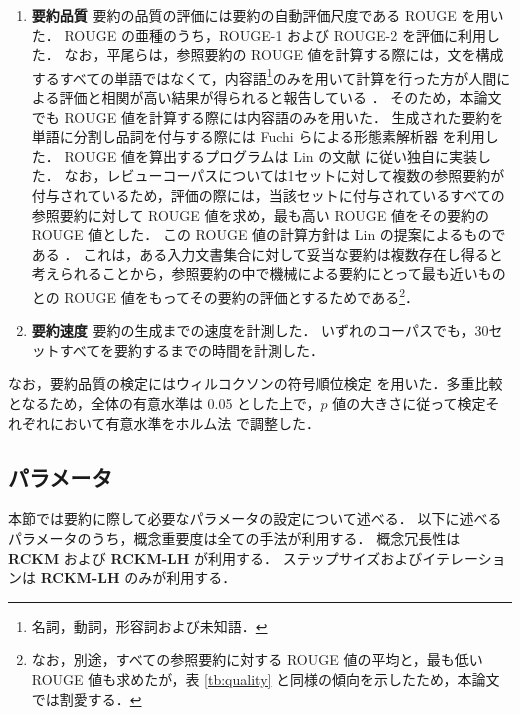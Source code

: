 \documentclass[japanese]{jnlp_1.4}
\begin{document}
\begin{enumerate}
\item {\bf 要約品質}\hspace{1zw}
\pagebreak
要約の品質の評価には要約の自動評価尺度である ROUGE \cite{lin04} を用いた．
ROUGE の亜種のうち，ROUGE-1 および ROUGE-2 を評価に利用した．
なお，平尾らは，参照要約の ROUGE 値を計算する際には，文を構成するすべての単語ではなくて，内容語\footnote{名詞，動詞，形容詞および未知語．}のみを用いて計算を行った方が人間による評価と相関が高い結果が得られると報告している \cite{hirao06}．
そのため，本論文でも ROUGE 値を計算する際には内容語のみを用いた．
生成された要約を単語に分割し品詞を付与する際には Fuchi らによる形態素解析器 \cite{fuchi98} を利用した．
ROUGE 値を算出するプログラムは Lin の文献 \cite{lin04} に従い独自に実装した．
なお，レビューコーパスについては1セットに対して複数の参照要約が付与されているため，評価の際には，当該セットに付与されているすべての参照要約に対して ROUGE 値を求め，最も高い ROUGE 値をその要約の ROUGE 値とした．
この ROUGE 値の計算方針は Lin の提案によるものである \cite{lin04}．
これは，ある入力文書集合に対して妥当な要約は複数存在し得ると考えられることから，参照要約の中で機械による要約にとって最も近いものとの ROUGE 値をもってその要約の評価とするためである\footnote{なお，別途，すべての参照要約に対する ROUGE 値の平均と，最も低い ROUGE 値も求めたが，表 \ref{tb:quality} と同様の傾向を示したため，本論文では割愛する．}．

\item {\bf 要約速度}\hspace{1zw}
要約の生成までの速度を計測した．
いずれのコーパスでも，30セットすべてを要約するまでの時間を計測した．
\end{enumerate}

なお，要約品質の検定にはウィルコクソンの符号順位検定 \cite{wilcoxon45} を用いた．多重比較となるため，全体の有意水準は 0.05 とした上で，$ p $ 値の大きさに従って検定それぞれにおいて有意水準をホルム法 \cite{holm79} で調整した．



\subsection{パラメータ}
\label{parameters}

本節では要約に際して必要なパラメータの設定について述べる．
以下に述べるパラメータのうち，概念重要度は全ての手法が利用する．
概念冗長性は {\bf RCKM} および {\bf RCKM-LH} が利用する．
ステップサイズおよびイテレーションは {\bf RCKM-LH} のみが利用する．
\end{document}
